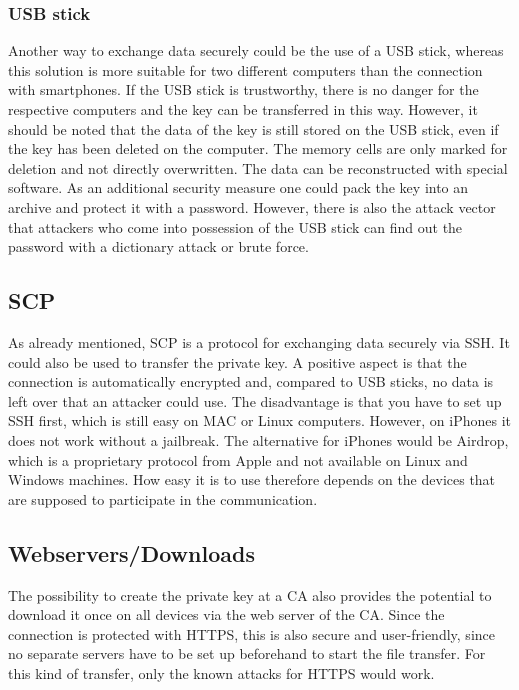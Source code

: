 \documentclass[12pt,oneside,a4paper,parskip]{scrbook}
\begin{document}
\subsubsection{USB stick}
Another way to exchange data securely could be the use of a USB stick, whereas this solution is more suitable for two different computers than the connection with smartphones. If the USB stick is trustworthy, there is no danger for the respective computers and the key can be transferred in this way. However, it should be noted that the data of the key is still stored on the USB stick, even if the key has been deleted on the computer. The memory cells are only marked for deletion and not directly overwritten. The data can be reconstructed with special software. \parencite{bsi_bsi_loeschen} \newline
As an additional security measure one could pack the key into an archive and protect it with a password. However, there is also the attack vector that attackers who come into possession of the USB stick can find out the password with a dictionary attack or brute force. \parencite{rehim_effective_2016}

\subsection{SCP}
As already mentioned, SCP is a protocol for exchanging data securely via SSH. It could also be used to transfer the private key. A positive aspect is that the connection is automatically encrypted and, compared to USB sticks, no data is left over that an attacker could use. The disadvantage is that you have to set up SSH first, which is still easy on MAC or Linux computers. However, on iPhones it does not work without a jailbreak. The alternative for iPhones would be Airdrop, which is a proprietary protocol from Apple and not available on Linux and Windows machines. How easy it is to use therefore depends on the devices that are supposed to participate in the communication. \parencite{winscp_how_nodate}

\subsection{Webservers/Downloads}
The possibility to create the private key at a CA also provides the potential to download it once on all devices via the web server of the CA. Since the connection is protected with HTTPS, this is also secure and user-friendly, since no separate servers have to be set up beforehand to start the file transfer. For this kind of transfer, only the known attacks for HTTPS would work.
\end{document}
